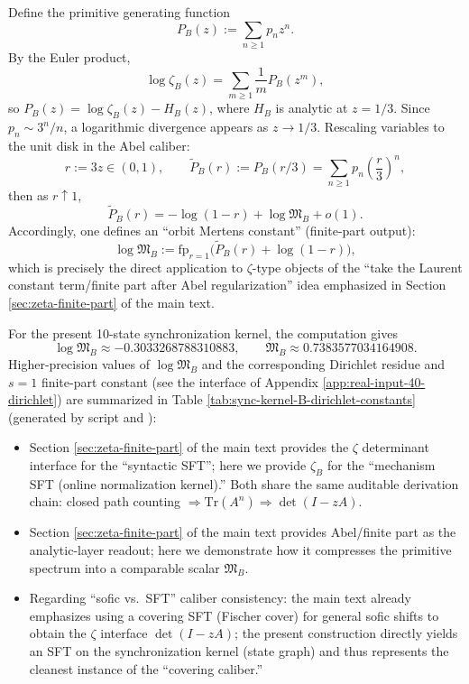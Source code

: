 Define the primitive generating function
\[
P_B(z):=\sum_{n\ge 1}p_n z^n.
\]
By the Euler product,
\[
\log\zeta_B(z)=\sum_{m\ge 1}\frac{1}{m}P_B(z^m),
\]
so $P_B(z)=\log\zeta_B(z)-H_B(z)$, where $H_B$ is analytic at $z=1/3$.
Since $p_n\sim 3^n/n$, a logarithmic divergence appears as $z\to 1/3$. Rescaling variables to the unit disk in the Abel caliber:
\[
r:=3z\in(0,1),\qquad
\widetilde P_B(r):=P_B(r/3)=\sum_{n\ge 1}p_n\left(\frac{r}{3}\right)^n,
\]
then as $r\uparrow 1$,
\[
\widetilde P_B(r)= -\log(1-r)+\log\mathfrak{M}_B+o(1).
\]
Accordingly, one defines an ``orbit Mertens constant'' (finite-part output):
\[
\log\mathfrak{M}_B
:=\mathrm{fp}_{r=1}\bigl(\widetilde P_B(r)+\log(1-r)\bigr),
\]
which is precisely the direct application to $\zeta$-type objects of the ``take the Laurent constant term/finite part after Abel regularization'' idea emphasized in Section \ref{sec:zeta-finite-part} of the main text.

For the present 10-state synchronization kernel, the computation gives
\[
\log \mathfrak{M}_B\approx -0.3033268788310883,
\qquad
\mathfrak{M}_B\approx 0.7383577034164908.
\]
Higher-precision values of $\log\mathfrak{M}_B$ and the corresponding Dirichlet residue and $s=1$ finite-part constant (see the interface of Appendix \ref{app:real-input-40-dirichlet}) are summarized in Table \ref{tab:sync-kernel-B-dirichlet-constants} (generated by script and \verb||):


\begin{remark}
\begin{itemize}
  \item Section \ref{sec:zeta-finite-part} of the main text provides the $\zeta$ determinant interface for the ``syntactic SFT''; here we provide $\zeta_B$ for the ``mechanism SFT (online normalization kernel).'' Both share the same auditable derivation chain: closed path counting $\Rightarrow \mathrm{Tr}(A^n) \Rightarrow \det(I-zA)$.
  \item Section \ref{sec:zeta-finite-part} of the main text provides Abel/finite part as the analytic-layer readout; here we demonstrate how it compresses the primitive spectrum into a comparable scalar $\mathfrak{M}_B$.
  \item Regarding ``sofic vs.\ SFT'' caliber consistency: the main text already emphasizes using a covering SFT (Fischer cover) for general sofic shifts to obtain the $\zeta$ interface $\det(I-zA)$; the present construction directly yields an SFT on the synchronization kernel (state graph) and thus represents the cleanest instance of the ``covering caliber.''
\end{itemize}
\end{remark}

